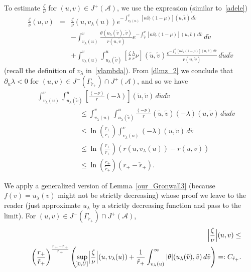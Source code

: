 \documentclass[a4paper,11pt,oneside,reqno]{amsart}
\newcommand{\cal}{\mathcal}
\newcommand{\ckrp}{\check r_+}
\newcommand{\cg}{\Gamma}
\begin{document}
To estimate $\frac{\zeta}{\nu}$ for $(u,v)\in J^+({\cal A})$, we use the expression (similar to~\eqref{adele})
\begin{eqnarray}
\frac{\zeta}{\nu}(u,v)&=&\frac{\zeta}{\nu}(u,v_\lambda(u))e^{-\int_{v_\lambda(u)}^v[\kappa\partial_r(1-\mu)](u,\tilde v)\,d\tilde v}\nonumber\\
&&-\int_{v_\lambda(u)}^v\frac{\theta({u_\lambda(\tilde v)},\tilde v)}{r(u,\tilde v)}e^{-\int_{\tilde v}^v[\kappa\partial_r(1-\mu)](u,\bar v)
\,d\bar v}\,d\tilde v\nonumber\\
&&+\int_{v_\lambda(u)}^v\int_{u_\lambda(\tilde v)}^u\left[\frac{\zeta}{\nu}\frac{\lambda}{r}\nu\right](\tilde u,\tilde v)\frac{e^{-\int_{\tilde v}^v[\kappa\partial_r(1-\mu)](u,\bar v)
\,d\bar v}}{r(u,\tilde v)}\,d\tilde ud\tilde v\label{shakira}
\end{eqnarray}
(recall the definition of $v_\lambda$ in~\eqref{vlambda}).
From \eqref{dlmz_2} we conclude that $\partial_u\lambda<0$ for $(u,v)\in J^-(\cg_{\ckrp})\cap J^+({\cal A})$, and so we have
\begin{eqnarray*}
&&\int_{v_\lambda(u)}^v\int_{u_\lambda(\tilde v)}^u
\left[\frac{(-\nu)}{r}(-\lambda)\right](\tilde u,\tilde v)\,d\tilde ud\tilde v\\
&&\qquad\qquad\qquad\leq\int_{v_\lambda(u)}^v\int_{u_\lambda(\tilde v)}^u
\frac{(-\nu)}{r}(\tilde u,\tilde v)(-\lambda)(u,\tilde v)\,d\tilde ud\tilde v\\
&&\qquad\qquad\qquad\leq\ln\left(\frac{r_+}{\ckrp}\right)\int_{v_\lambda(u)}^v
(-\lambda)(u,\tilde v)\,d\tilde v\\
&&\qquad\qquad\qquad\leq\ln\left(\frac{r_+}{\ckrp}\right)(r(u,v_\lambda(u))-r(u,v))\\
&&\qquad\qquad\qquad\leq\ln\left(\frac{r_+}{\ckrp}\right)(r_+-\ckrp).
\end{eqnarray*}

We apply a generalized version of Lemma~\ref{our_Gronwall3} (because $f(v)=u_\lambda(v)$
might not be strictly decreasing) whose proof we leave to the reader (just approximate
$u_\lambda$ by a strictly decreasing function and pass to the limit).
For $(u,v)\in J^-(\cg_{\ckrp})\cap J^+({\cal A})$,
\begin{eqnarray}
&&\Bigl|\frac{\zeta}{\nu}\Bigr|(u,v)\leq\label{zeta_nu_3}\\
&&\ \
\left(\frac{r_+}{\ckrp}\right)^{\frac{r_+-\ckrp}{\ckrp}}
 \left(\sup_{\left]0,U\right]}\Bigl|\frac{\zeta}{\nu}\Bigr|(u,v_\lambda(u))+\frac{1}{\ckrp}
 \int_{v_\lambda(u)}^\infty|\theta|(u_\lambda(\tilde v),\tilde v)\,d\tilde v\right)=:C_{\ckrp}.
\nonumber
\end{eqnarray}
\end{document}
